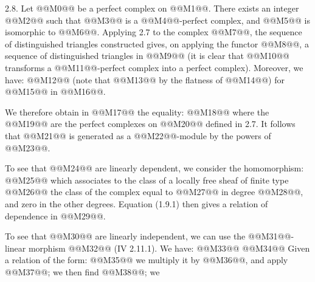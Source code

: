 2.8.
Let @@M0@@ be a perfect complex on @@M1@@. There exists an integer @@M2@@ such that @@M3@@ is a @@M4@@-perfect complex, and @@M5@@ is isomorphic to @@M6@@. Applying 2.7 to the complex @@M7@@, the sequence of distinguished triangles constructed gives, on applying the functor @@M8@@, a sequence of distinguished triangles in @@M9@@ (it is clear that @@M10@@ transforms a @@M11@@-perfect complex into a perfect complex). Moreover, we have:
@@M12@@
(note that @@M13@@ by the flatness of @@M14@@) for @@M15@@ in @@M16@@.

We therefore obtain in @@M17@@ the equality:
@@M18@@
where the @@M19@@ are the perfect complexes on @@M20@@ defined in 2.7. It follows that @@M21@@ is generated as a @@M22@@-module by the powers of @@M23@@.

To see that @@M24@@ are linearly dependent, we consider the homomorphism: @@M25@@ which associates to the class of a locally free sheaf of finite type @@M26@@ the class of the complex equal to @@M27@@ in degree @@M28@@, and zero in the other degrees. Equation (1.9.1) then gives a relation of dependence in @@M29@@.

To see that @@M30@@ are linearly independent, we can use the @@M31@@-linear morphism @@M32@@ (IV 2.11.1). We have:
@@M33@@
@@M34@@
Given a relation of the form:
@@M35@@
we multiply it by @@M36@@, and apply @@M37@@; we then find @@M38@@; we
